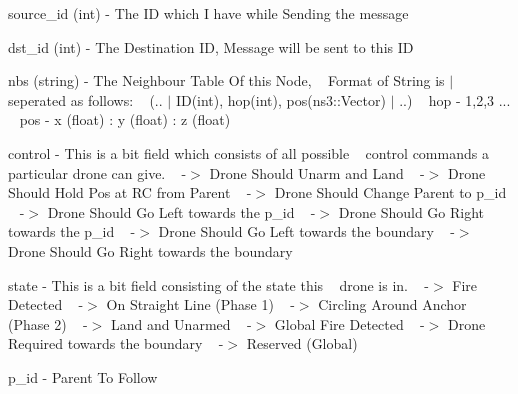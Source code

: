 \begin{DoxyItemize}
\item source\+\_\+id (int) -\/ The ID which I have while Sending the message ~\newline

\item dst\+\_\+id (int) -\/ The Destination ID, Message will be sent to this ID ~\newline

\item nbs (string) -\/ The Neighbour Table Of this Node, ~\newline
 Format of String is $\vert$ seperated as follows\+: ~\newline
 (.. $\vert$ I\+D(int), hop(int), pos(ns3\+::\+Vector) $\vert$ ..) ~\newline
 hop -\/ 1,2,3 ... ~\newline
 pos -\/ x (float) \+: y (float) \+: z (float) ~\newline

\item control -\/ This is a bit field which consists of all possible ~\newline
 control commands a particular drone can give. ~ -\/$>$ Drone Should Unarm and Land ~ -\/$>$ Drone Should Hold Pos at RC from Parent ~ -\/$>$ Drone Should Change Parent to p\+\_\+id ~ -\/$>$ Drone Should Go Left towards the p\+\_\+id ~ -\/$>$ Drone Should Go Right towards the p\+\_\+id ~ -\/$>$ Drone Should Go Left towards the boundary ~ -\/$>$ Drone Should Go Right towards the boundary ~\newline

\item state -\/ This is a bit field consisting of the state this ~\newline
 drone is in. ~ -\/$>$ Fire Detected ~ -\/$>$ On Straight Line (Phase 1) ~ -\/$>$ Circling Around Anchor (Phase 2) ~ -\/$>$ Land and Unarmed ~ -\/$>$ Global Fire Detected ~ -\/$>$ Drone Required towards the boundary ~ -\/$>$ Reserved (Global) ~\newline

\item p\+\_\+id -\/ Parent To Follow ~\newline

\end{DoxyItemize}

